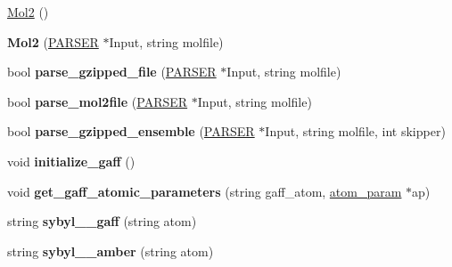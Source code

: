 \begin{DoxyCompactItemize}
\item 
\hyperlink{classMol2_a418668977615fd445e59cb4a49e98787}{Mol2} ()
\item 
\hypertarget{classMol2_ae1d5f65764f483ef0202d0fb9374557d}{
{\bfseries Mol2} (\hyperlink{classPARSER}{PARSER} $\ast$Input, string molfile)}
\label{classMol2_ae1d5f65764f483ef0202d0fb9374557d}

\item 
\hypertarget{classMol2_a0c47e92dbbd1c9b82e310f2fb8c7c607}{
bool {\bfseries parse\_\-gzipped\_\-file} (\hyperlink{classPARSER}{PARSER} $\ast$Input, string molfile)}
\label{classMol2_a0c47e92dbbd1c9b82e310f2fb8c7c607}

\item 
\hypertarget{classMol2_aae3befcff264c7bd4843ea4038e79328}{
bool {\bfseries parse\_\-mol2file} (\hyperlink{classPARSER}{PARSER} $\ast$Input, string molfile)}
\label{classMol2_aae3befcff264c7bd4843ea4038e79328}

\item 
\hypertarget{classMol2_a63f69cd391baa0413b25222ae8040c53}{
bool {\bfseries parse\_\-gzipped\_\-ensemble} (\hyperlink{classPARSER}{PARSER} $\ast$Input, string molfile, int skipper)}
\label{classMol2_a63f69cd391baa0413b25222ae8040c53}

\item 
\hypertarget{classMol2_afd54ce3d57ba43d53f471758251a032d}{
void {\bfseries initialize\_\-gaff} ()}
\label{classMol2_afd54ce3d57ba43d53f471758251a032d}

\item 
\hypertarget{classMol2_ae78d6728556da4ce73b7e0bb2ff6b2ba}{
void {\bfseries get\_\-gaff\_\-atomic\_\-parameters} (string gaff\_\-atom, \hyperlink{structMol2_1_1atom__param}{atom\_\-param} $\ast$ap)}
\label{classMol2_ae78d6728556da4ce73b7e0bb2ff6b2ba}

\item 
\hypertarget{classMol2_acf278b038166af8801bb4a32eb05bc66}{
string {\bfseries sybyl\_\_\-gaff} (string atom)}
\label{classMol2_acf278b038166af8801bb4a32eb05bc66}

\item 
\hypertarget{classMol2_a8ee4dc0edb8a381b6ce1cb5f13ebe0ed}{
string {\bfseries sybyl\_\_\-amber} (string atom)}
\label{classMol2_a8ee4dc0edb8a381b6ce1cb5f13ebe0ed}

\end{DoxyCompactItemize}
